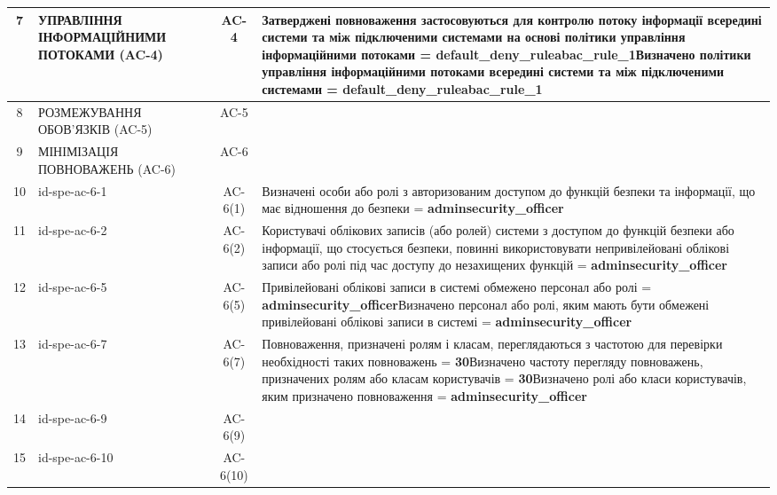 \documentclass[10pt]{article}
\begin{document}
\begin{longtable}{|c|>{\raggedright\arraybackslash}p{2.5cm}|>{\raggedright\arraybackslash}p{4.5cm}|c|>{\raggedright\arraybackslash}p{4.5cm}|}
7 & УПРАВЛІННЯ ІНФОРМАЦІЙНИМИ ПОТОКАМИ (AC-4) &  & AC-4 & Затверджені повноваження застосовуються для контролю потоку інформації всередині системи та між підключеними системами на основі політики управління інформаційними потоками = \textbf{default\_\allowbreak{}deny\_\allowbreak{}ruleabac\_\allowbreak{}rule\_\allowbreak{}1}\newline Визначено політики управління інформаційними потоками всередині системи та між підключеними системами = \textbf{default\_\allowbreak{}deny\_\allowbreak{}ruleabac\_\allowbreak{}rule\_\allowbreak{}1} \\ \hline
8 & РОЗМЕЖУВАННЯ ОБОВ'ЯЗКІВ (AC-5) &  & AC-5 &  \\ \hline
9 & МІНІМІЗАЦІЯ ПОВНОВАЖЕНЬ (AC-6) &  & AC-6 &  \\ \hline
10 & id-spe-ac-6-1 &  & AC-6(1) & Визначені особи або ролі з авторизованим доступом до функцій безпеки та інформації, що має відношення до безпеки = \textbf{adminsecurity\_\allowbreak{}officer} \\ \hline
11 & id-spe-ac-6-2 &  & AC-6(2) & Користувачі облікових записів (або ролей) системи з доступом до функцій безпеки або інформації, що стосується безпеки, повинні використовувати непривілейовані облікові записи або ролі під час доступу до незахищених функцій = \textbf{adminsecurity\_\allowbreak{}officer} \\ \hline
12 & id-spe-ac-6-5 &  & AC-6(5) & Привілейовані облікові записи в системі обмежено персонал або ролі = \textbf{adminsecurity\_\allowbreak{}officer}\newline Визначено персонал або ролі, яким мають бути обмежені привілейовані облікові записи в системі = \textbf{adminsecurity\_\allowbreak{}officer} \\ \hline
13 & id-spe-ac-6-7 &  & AC-6(7) & Повноваження, призначені ролям і класам, переглядаються з частотою для перевірки необхідності таких повноважень = \textbf{30}\newline Визначено частоту перегляду повноважень, призначених ролям або класам користувачів = \textbf{30}\newline Визначено ролі або класи користувачів, яким призначено повноваження  = \textbf{adminsecurity\_\allowbreak{}officer} \\ \hline
14 & id-spe-ac-6-9 &  & AC-6(9) &  \\ \hline
15 & id-spe-ac-6-10 &  & AC-6(10) &  \\ \hline

\end{longtable}
\end{document}
